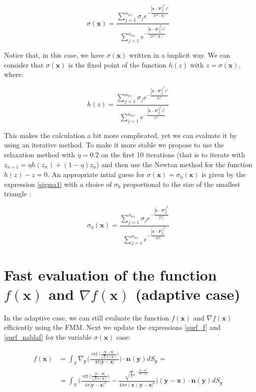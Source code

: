 \documentclass[11pt, oneside]{article}
\DeclareMathOperator\erf{erf}
\newcommand\bx{\boldsymbol x}
\newcommand\by{\boldsymbol y}
\newcommand\bn{\boldsymbol n}
\newcommand\bP{\boldsymbol P}
\begin{document}
\begin{equation}\label{sigma2}
\sigma(\bx)=\frac{\sum_{j=1}^{n_{tri}}\sigma_je^{-\frac{|\bx-\bP_j^c|^2 \lambda^2}{2\sigma^2(\bx)}}}{\sum_{j=1}^{n_{tri}}e^{-\frac{|\bx-\bP_j^c|^2 \lambda^2}{2\sigma^2(\bx)}}}
\end{equation}

Notice that, in this case, we have $\sigma(\bx)$ written in a implicit way. We can consider that $\sigma(\bx)$ is the fixed point of the function $h(z)$ with $z=\sigma(\bx)$, where:

\begin{equation}\label{sigma2}
h(z)=\frac{\sum_{j=1}^{n_{tri}}\sigma_je^{-\frac{|\bx-\bP_j^c|^2 \lambda^2}{2z^2}}}{\sum_{j=1}^{n_{tri}}e^{-\frac{|\bx-\bP_j^c|^2 \lambda^2}{2z^2}}}
\end{equation}

This makes the calculation a bit more complicated, yet we can evaluate it by using an iterative method. To make it more stable we propose to use the relaxation method with $\eta=0.2$ on the first 10 iterations (that is to iterate with $z_{n+1}=\eta h(z_n)+(1-\eta)z_n$) and then use the Newton method for the function $h(z)-z=0$. An appropriate intial guess for $\sigma(\bx)=\sigma_0(\bx)$ is given by the expression \ref{sigma1} with a choice of $\sigma_0$ proportional to the size of the smallest triangle :
 
\begin{equation}\label{sigma0}
\sigma_0(\bx)=\frac{\sum_{j=1}^{n_{tri}}\sigma_je^{- \frac{|\bx-\bP_j^c|^2}{2\sigma^2_1}}}{\sum_{j=1}^{n_{tri}}e^{-\frac{|\bx-\bP_j^c|^2}{2\sigma^2_1}}}
\end{equation}

\section{Fast evaluation of the function $f(\bx)$ and $\nabla f(\bx)$ (adaptive case)}

In the adaptive case, we can still evaluate the function $f(\bx)$ and $\nabla f(\bx)$ efficiently using the FMM. Next we update the expressions \ref{surf_f} and \ref{surf_nablaf} for the variable $\sigma(\bx)$ case:

 
\begin{equation}
\begin{aligned}
f(\bx)&=\int_{\mathit{S}}\nabla_{\by}\Big(\frac{\erf\big(\frac{|\by-\bx|}{\sqrt{2}\sigma(\bx)}\big)}{4\pi|\by-\bx|}\Big)\cdot\bn(\by)dS_{\by}=\\
&=\int_{\mathit{S}}\Bigg(\frac{\erf\big(\frac{|\by-\bx|}{\sqrt{2}\sigma(\bx)}\big)}{4\pi|\by-\bx|^3}-\frac{\sqrt{\frac{2}{\pi}}e^{-\frac{|\by-\bx|^2}{2\sigma^2(\bx)}}}{4\pi\sigma(\bx)|\by-\bx|^2}\Bigg)(\by-\bx)\cdot\bn(\by)dS_{\by}
\end{aligned}
\end{equation}
\end{document}
